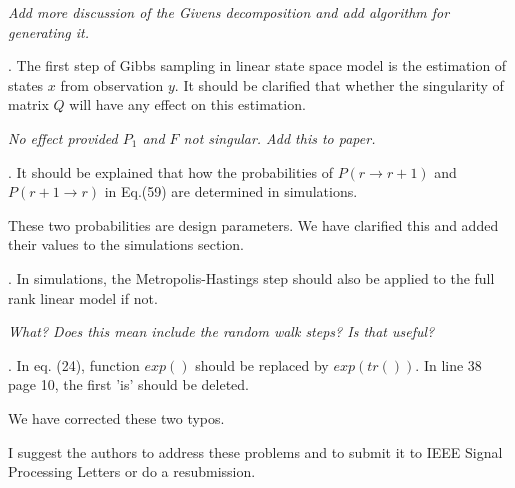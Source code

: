 \documentclass{article}
\newenvironment{review}[0]{\begin{itshape}\color{Gray}\noindent}{\end{itshape}\vspace{0.4cm}}
\newenvironment{response}[0]{\noindent}{\vspace{0.4cm}}
\newcommand{\meta}[1]{{\color{red}\em #1}}
\begin{document}
\begin{response}
 \meta{Add more discussion of the Givens decomposition and add algorithm for generating it.}
\end{response}

\begin{review}
5.   The first step of Gibbs sampling in linear state space model is the estimation of states $x$ from observation $y$. It should be clarified that whether the singularity of matrix $Q$ will have any effect on this estimation. 
\end{review}

\begin{response}
 \meta{No effect provided $P_1$ and $F$ not singular. Add this to paper.}
\end{response}

\begin{review}
6.  It should be explained that how the probabilities of $P(r \to r+1)$ and $P(r+1 \to r)$ in Eq.(59) are determined in simulations.
\end{review}

\begin{response}
 These two probabilities are design parameters. We have clarified this and added their values to the simulations section.
\end{response}

\begin{review}
7.  In simulations, the Metropolis-Hastings step should also be applied to the full rank linear model if not. 
\end{review}

\begin{response}
 \meta{What? Does this mean include the random walk steps? Is that useful?}
\end{response}

\begin{review}
8.  In eq. (24), function $exp()$ should be replaced by $exp(tr())$. In line 38 page 10, the first 'is' should be deleted.
\end{review}

\begin{response}
 We have corrected these two typos.
\end{response}

\begin{review}
I suggest the authors to address these problems and to submit it to IEEE Signal Processing Letters or do a resubmission.
\end{review}
\end{document}
